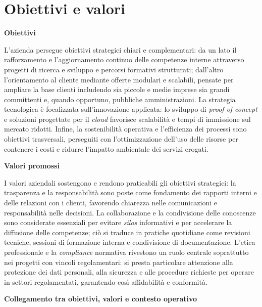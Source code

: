 \section{Obiettivi e valori}

\medskip
\noindent\textbf{Obiettivi}

L'azienda persegue obiettivi strategici chiari e complementari: da un lato il rafforzamento e l'aggiornamento continuo delle competenze interne attraverso progetti di ricerca e sviluppo e percorsi formativi
strutturati; dall'altro l'orientamento al cliente mediante offerte modulari e scalabili, pensate per ampliare la base clienti includendo sia piccole e medie imprese sia grandi committenti e,
quando opportuno, pubbliche amministrazioni. La strategia tecnologica è focalizzata sull'innovazione applicata: lo sviluppo di \emph{proof of concept} e soluzioni progettate per il \emph{cloud} favorisce
scalabilità e tempi di immissione sul mercato ridotti. Infine, la sostenibilità operativa e l'efficienza dei processi sono obiettivi trasversali, perseguiti con l'ottimizzazione dell'uso
delle risorse per contenere i costi e ridurre l'impatto ambientale dei servizi erogati.

\medskip
\noindent\textbf{Valori promossi}

I valori aziendali sostengono e rendono praticabili gli obiettivi strategici: la trasparenza e la responsabilità sono poste come fondamento dei
rapporti interni e delle relazioni con i clienti, favorendo chiarezza nelle comunicazioni e responsabilità nelle decisioni. La collaborazione e
la condivisione delle conoscenze sono considerate essenziali per evitare \emph{silos} informativi e per accelerare la diffusione delle competenze;
ciò si traduce in pratiche quotidiane come revisioni tecniche, sessioni di formazione interna e condivisione di documentazione.
L'etica professionale e la \emph{compliance} normativa rivestono un ruolo centrale soprattutto nei progetti con vincoli regolamentari:
si presta particolare attenzione alla protezione dei dati personali, alla sicurezza e alle procedure richieste per operare in settori regolamentati, garantendo così affidabilità e conformità.

\medskip
\noindent\textbf{Collegamento tra obiettivi, valori e contesto operativo}


